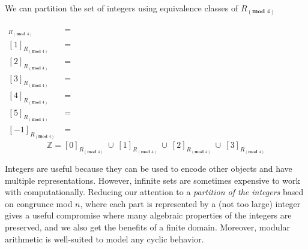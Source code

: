 \documentclass[12pt, oneside]{article}
\begin{document}
We can partition the set of integers using equivalence classes of  $R_{(\textbf{mod } 4)}$

\begin{align*}
    [0]_{R_{(\textbf{mod } 4)}} &= \phantom{ \{ x \in \mathbb{Z} \mid x \equiv 0 ((\textbf{mod } 4)) \} 
    = \{ x \in \mathbb{Z} \mid x \textbf{ mod } 4 = 0 \textbf{ mod } 4 = 0 \} = \{ 4c \mid c \in \mathbb{Z}\} }\\
    [1]_{R_{(\textbf{mod } 4)}} &= \phantom{ \{ x \in \mathbb{Z} \mid x \equiv 1 ((\textbf{mod } 4)) \} 
    = \{ x \in \mathbb{Z} \mid x \textbf{ mod } 4 = 1 \textbf{ mod } 4 = 1 \} = \{ 4c+1 \mid c \in \mathbb{Z}\} }\\
    [2]_{R_{(\textbf{mod } 4)}} &= \phantom{ \{ x \in \mathbb{Z} \mid x \equiv 2 ((\textbf{mod } 4)) \} 
    = \{ x \in \mathbb{Z} \mid x \textbf{ mod } 4 = 2 \textbf{ mod } 4 = 0 \} = \{ 4c+2 \mid c \in \mathbb{Z}\} }\\
    [3]_{R_{(\textbf{mod } 4)}} &= \phantom{ \{ x \in \mathbb{Z} \mid x \equiv 3 ((\textbf{mod } 4)) \} 
    = \{ x \in \mathbb{Z} \mid x \textbf{ mod } 4 = 3 \textbf{ mod } 4 = 3 \} = \{ 4c+3 \mid c \in \mathbb{Z}\} }\\
    [4]_{R_{(\textbf{mod } 4)}} &= \phantom{ \{ x \in \mathbb{Z} \mid x \equiv 4 ((\textbf{mod } 4)) \} 
    = \{ x \in \mathbb{Z} \mid x \textbf{ mod } 4 = 4 \textbf{ mod } 4 = 0 \} = \{ 4c \mid c \in \mathbb{Z}\} }\\
    [5]_{R_{(\textbf{mod } 4)}} &= \phantom{ \{ x \in \mathbb{Z} \mid x \equiv 5 ((\textbf{mod } 4)) \} 
    = \{ x \in \mathbb{Z} \mid x \textbf{ mod } 4 = 5 \textbf{ mod } 4 = 1 \} = \{ 4c+1 \mid c \in \mathbb{Z}\} }\\
    [-1]_{R_{(\textbf{mod } 4)}} &= \phantom{ \{ x \in \mathbb{Z} \mid x \equiv -1 ((\textbf{mod } 4)) \} 
    = \{ x \in \mathbb{Z} \mid x \textbf{ mod } 4 = -1 \textbf{ mod } 4 = 3 \} = \{ 4c+3 \mid c \in \mathbb{Z}\} }
\end{align*}
\[
\mathbb{Z} =  [0]_{R_{(\textbf{mod } 4)}}~ \cup ~[1]_{R_{(\textbf{mod } 4)}} ~\cup~[2]_{R_{(\textbf{mod } 4)}}~\cup~
[3]_{R_{(\textbf{mod } 4)}}
\]





 \vfill


Integers are useful because they can be used to encode other objects
and have multiple representations. However, infinite sets are sometimes
expensive to work with computationally. Reducing our attention to 
a {\it partition of the integers} based on congrunce mod $n$, where
each part is represented by a (not too large) integer gives a useful 
compromise where many algebraic properties of the integers are preserved, 
and we also get the benefits of a finite domain. Moreover, modular arithmetic
is well-suited to model any cyclic behavior. \vfill
\newpage
\end{document}
